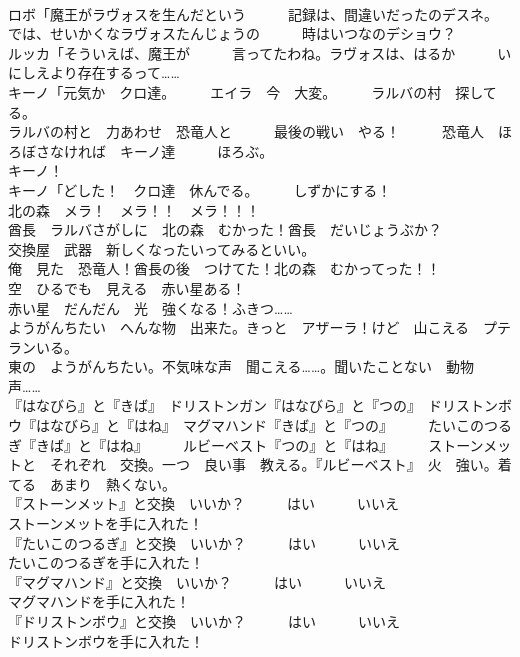\documentclass[8pt]{extreport}
\begin{document}
\begin{CJK}{UTF8}{min}
\\	ロボ「魔王がラヴォスを生んだという　　　記録は、間違いだったのデスネ。　　　では、せいかくなラヴォスたんじょうの　　　時はいつなのデショウ？	
\\	ルッカ「そういえば、魔王が　　　言ってたわね。ラヴォスは、はるか　　　いにしえより存在するって……	
\\	キーノ「元気か　クロ達。　　　エイラ　今　大変。　　　ラルバの村　探してる。	
\\	ラルバの村と　力あわせ　恐竜人と　　　最後の戦い　やる！　　　恐竜人　ほろぼさなければ　キーノ達　　　ほろぶ。	
\\	キーノ！	
\\	キーノ「どした！　クロ達　休んでる。　　　しずかにする！	
\\	北の森　メラ！　メラ！！　メラ！！！	
\\	酋長　ラルバさがしに　北の森　むかった！酋長　だいじょうぶか？	
\\	交換屋　武器　新しくなったいってみるといい。	
\\	俺　見た　恐竜人！酋長の後　つけてた！北の森　むかってった！！	
\\	空　ひるでも　見える　赤い星ある！	
\\	赤い星　だんだん　光　強くなる！ふきつ……	
\\	ようがんちたい　へんな物　出来た。きっと　アザーラ！けど　山こえる　プテランいる。	
\\	東の　ようがんちたい。不気味な声　聞こえる……。聞いたことない　動物　声……	
\\	『はなびら』と『きば』　ドリストンガン『はなびら』と『つの』　ドリストンボウ『はなびら』と『はね』　マグマハンド『きば』と『つの』　　　たいこのつるぎ『きば』と『はね』　　　ルビーベスト『つの』と『はね』　　　ストーンメットと　それぞれ　交換。一つ　良い事　教える。『ルビーベスト』　火　強い。着てる　あまり　熱くない。	
\\	『ストーンメット』と交換　いいか？　　　はい　　　いいえ	
\\	ストーンメットを手に入れた！	
\\	『たいこのつるぎ』と交換　いいか？　　　はい　　　いいえ	
\\	たいこのつるぎを手に入れた！	
\\	『マグマハンド』と交換　いいか？　　　はい　　　いいえ	
\\	マグマハンドを手に入れた！	
\\	『ドリストンボウ』と交換　いいか？　　　はい　　　いいえ	
\\	ドリストンボウを手に入れた！	

\end{CJK}
\end{document}

